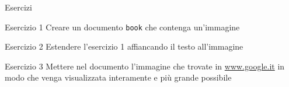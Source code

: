\begin{frame}{Esercizi}

\begin{block}{Esercizio 1}
Creare un documento \texttt{book} che contenga un'immagine
\end{block}

\begin{block}{Esercizio 2}
Estendere l'esercizio 1 affiancando il testo all'immagine
\end{block}

\begin{block}{Esercizio 3}
Mettere nel documento l'immagine che trovate in \url{www.google.it} in modo che
venga visualizzata interamente e più grande possibile
\end{block}

\end{frame}